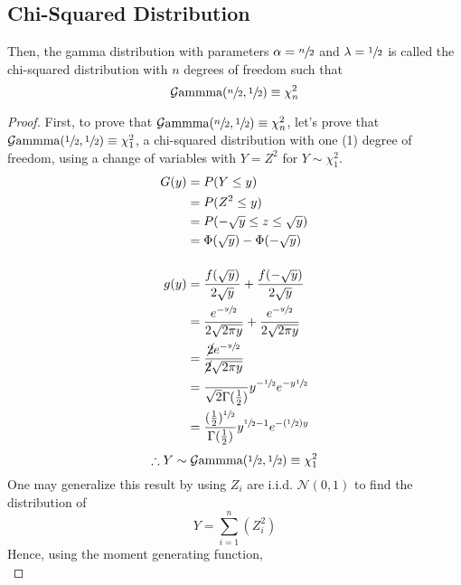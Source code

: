 \documentclass[12pt]{article}
\newcommand{\G}{\mathcal{G}}
\newcommand{\N}{\mathcal{N}}
\begin{document}
\pagebreak
\subsection{Chi-Squared Distribution}
	Then, the gamma distribution with parameters $\alpha=\sfrac{n}{2}$ and $\lambda=\sfrac{1}{2}$ is called the
	chi-squared distribution with $n$ degrees of freedom such that
	\begin{equation*}
		\G\text{ammma}(\sfrac{n}{2}, \sfrac{1}{2})\equiv\chi^2_n
	\end{equation*}
	\begin{proof}
		First, to prove that $\G\text{ammma}(\sfrac{n}{2},\sfrac{1}{2})\equiv\chi^2_n$, let's prove that
		$\G\text{ammma}(\sfrac{1}{2},\sfrac{1}{2})\equiv\chi^2_1$, a chi-squared distribution with one (1) degree of
		freedom, using a change of variables with $Y=Z^2$ for $Y\sim\chi^2_1$.
		\begin{equation}\label{eq:relation:chisquared:1}
			\begin{split}
				G(y)	&=	P(Y\leq y)\\
						&=	P(Z^2\leq y)\\
						&=	P(-\sqrt{y}\leq z \leq \sqrt{y})\\
						&=	\Phi(\sqrt{y})-\Phi(-\sqrt{y})\\[12pt]
				g(y)	&=	\frac{f(\sqrt{y})}{2\sqrt{y}}+\frac{f(-\sqrt{y})}{2\sqrt{y}}\\
						&=	\frac{e^{-\sfrac{y}{2}}}{2\sqrt{2\pi y}} + \frac{e^{-\sfrac{y}{2}}}{2\sqrt{2\pi y}}\\
						&=	\frac{\cancel{2}e^{-\sfrac{y}{2}}}{\cancel{2}\sqrt{2\pi y}}\\
						&=	\frac{}{\sqrt{2}\Gamma(\frac{1}{2})}y^{-\sfrac{1}{2}}e^{-y\sfrac{1}{2}}\\
						&=	\frac{(\frac{1}{2})^{\sfrac{1}{2}}}{\Gamma(\frac{1}{2})}y^{\sfrac{1}{2}-1}e^{-(\sfrac{1}{2})y}
				\end{split}
		\end{equation}
		\begin{equation*}
			\therefore Y\sim\G\text{ammma}(\sfrac{1}{2}, \sfrac{1}{2})\equiv\chi^2_1
		\end{equation*}
		One may generalize this result by using $Z_i$ are i.i.d. $\N(0, 1)$ to find the distribution of
		\begin{equation*}
			Y = \sum^n_{i=1}(Z^2_i)
		\end{equation*}
		Hence, using the moment generating function,
		\begin{equation}\label{eq:relation:chisquared:n}

\end{equation}
\end{proof}
\end{document}
